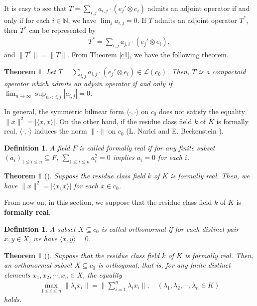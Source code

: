 \documentclass[12pt]{amsart}
\theoremstyle{plain}
\newtheorem{thm}[prop] {Theorem}
\newtheorem{dfn} [prop]{Definition}
\theoremstyle{definition}
\begin{document}
It is easy to see that $T = \sum_{i,j} a_{i,j} \cdot (e_j' \otimes e_i)$ admits an adjoint operator if and only if for each $i \in \mathbb{N}$, we have $\lim_{j} a_{i,j} = 0$. If $T$ admits an adjoint operator $T^*$, then $T^*$ can  be represented by
\begin{align*}
  T^* = \sum_{i,j} a_{j,i} \cdot (e_j' \otimes e_i),
\end{align*}
and $\|T^*\| = \|T\|$. From Theorem \ref{c1}, we have the following theorem.

\begin{thm} \label{c2}
  Let $T = \sum_{i,j} a_{i,j} \cdot (e_j' \otimes e_i) \in \mathcal{L}(c_0)$. Then, $T$ is a compactoid operator which admits an adjoin operator if and only if $\lim_{n \to \infty} \sup_{n < i,j} |a_{i,j}| = 0$.
\end{thm}

In general, the symmetric bilinear form $\langle \cdot, \cdot \rangle$ on $c_0$ does not satisfy the equality $\|x\|^2 = |\langle x, x \rangle |$. On the other hand, if the residue class field $k$ of $K$ is formally real, $\langle \cdot, \cdot \rangle$ induces the norm $\|\cdot\|$ on $c_0$ (L. Narici and E. Beckenstein \cite{inner}). 

\begin{dfn}
  A field $F$ is called formally real if for any finite subset $(a_i)_{1 \le i \le n} \subseteq F$, $\sum_{1 \le i \le n} a_i^2 = 0$ implies $a_i = 0$ for each $i$.
\end{dfn}

\begin{thm}[{\cite[Theorem 6.1]{inner}}]
  Suppose the residue class field $k$ of $K$ is formally real. Then, we have $\|x\|^2 = |\langle x, x \rangle |$ for each $x \in c_0$.
\end{thm}

From now on, in this section, we suppose that the residue class field $k$ of $K$ is \textbf{formally real}.

\begin{dfn}
  A subset $X \subseteq c_0$ is called orthonormal if for each distinct pair $x, y \in X$, we have $\langle x, y \rangle = 0$.
\end{dfn}

\begin{thm}[{\cite[Theorem 3.1]{inner}}]
  Suppose that the residue class field $k$ of $K$ is formally real. Then, an orthonormal subset $X \subseteq c_0$ is orthogonal, that is, for any finite distinct elements $x_1, x_2, \cdots, x_n \in X$, the equality
  \begin{align*}
 \max_{1 \leq i \leq n}  \| \lambda_i x_i \| = \| \sum_{i=1}^{n} \lambda_i x_i \|, \quad (\lambda_1, \lambda_2, \cdots, \lambda_n \in K)
\end{align*}
holds.
\end{thm}
\end{document}
